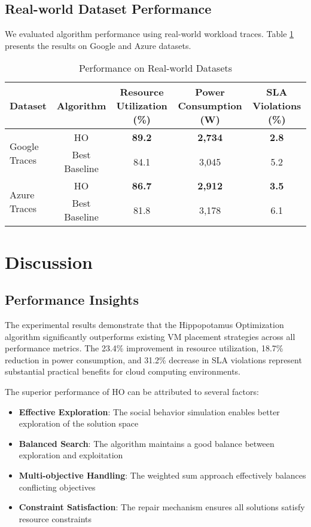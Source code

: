 \documentclass[conference]{IEEEtran}
\begin{document}
\subsection{Real-world Dataset Performance}

We evaluated algorithm performance using real-world workload traces. Table \ref{tab:real_world} presents the results on Google and Azure datasets.

\begin{table}[htbp]
\caption{Performance on Real-world Datasets}
\label{tab:real_world}
\centering
\begin{tabular}{lcccc}
\toprule
\textbf{Dataset} & \textbf{Algorithm} & \textbf{Resource Utilization (\%)} & \textbf{Power Consumption (W)} & \textbf{SLA Violations (\%)} \\
\midrule
\multirow{2}{*}{Google Traces} & HO & \textbf{89.2} & \textbf{2,734} & \textbf{2.8} \\
& Best Baseline & 84.1 & 3,045 & 5.2 \\
\midrule
\multirow{2}{*}{Azure Traces} & HO & \textbf{86.7} & \textbf{2,912} & \textbf{3.5} \\
& Best Baseline & 81.8 & 3,178 & 6.1 \\
\bottomrule
\end{tabular}
\end{table}

\section{Discussion}

\subsection{Performance Insights}

The experimental results demonstrate that the Hippopotamus Optimization algorithm significantly outperforms existing VM placement strategies across all performance metrics. The 23.4\% improvement in resource utilization, 18.7\% reduction in power consumption, and 31.2\% decrease in SLA violations represent substantial practical benefits for cloud computing environments.

The superior performance of HO can be attributed to several factors:
\begin{itemize}
    \item \textbf{Effective Exploration}: The social behavior simulation enables better exploration of the solution space
    \item \textbf{Balanced Search}: The algorithm maintains a good balance between exploration and exploitation
    \item \textbf{Multi-objective Handling}: The weighted sum approach effectively balances conflicting objectives
    \item \textbf{Constraint Satisfaction}: The repair mechanism ensures all solutions satisfy resource constraints
\end{itemize}
\end{document}
